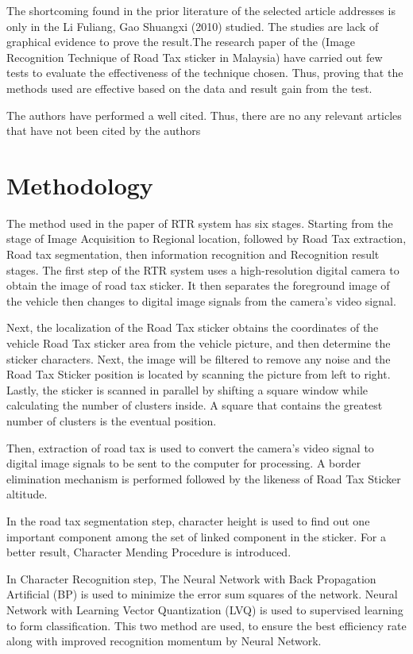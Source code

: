 \documentclass[12pt]{article}
\begin{document}
The shortcoming found in the prior literature of the selected article addresses is only in the Li Fuliang, Gao Shuangxi (2010) studied. The studies are lack of graphical evidence to prove the result.The research paper of the (Image Recognition Technique of Road Tax sticker in Malaysia) have carried out few tests to evaluate the effectiveness of the technique chosen. Thus, proving that the methods used are effective based on the data and result gain from the test.\cite{bpnn}

The authors have performed a well cited. Thus, there are no any relevant articles that have not been cited by the authors


\section{Methodology}
The method used in the paper of RTR system has six stages. Starting from the stage of Image Acquisition to Regional location, followed by Road Tax extraction, Road tax segmentation, then information recognition and Recognition result stages.
The first step of the RTR system uses a high-resolution digital camera to obtain the image of road tax sticker. It then separates the foreground image of the vehicle then changes to digital image signals from the camera's video signal. \cite{par}

Next, the localization of the Road Tax sticker obtains the coordinates of the vehicle Road Tax sticker area from the vehicle picture, and then determine the sticker characters. Next, the image will be filtered to remove any noise and the Road Tax Sticker position is located by scanning the picture from left to right. Lastly, the sticker is scanned in parallel by shifting a square window while calculating the number of clusters inside. A square that contains the greatest number of clusters is the eventual position.   

Then, extraction of road tax is used to convert the camera's video signal to digital image signals to be sent to the computer for processing. A border elimination mechanism is performed followed by the likeness of Road Tax Sticker altitude.  

In the road tax segmentation step, character height is used to find out one important component among the set of linked component in the sticker. For a better result, Character Mending Procedure is introduced.

In Character Recognition step, The Neural Network with Back Propagation Artificial (BP) is used to minimize the error sum squares of the network. Neural Network with Learning Vector Quantization (LVQ) is used to supervised learning to form classification. This two method are used, to ensure the best efficiency rate along with improved recognition momentum by Neural Network.\cite{location}\cite{bpnn}
\end{document}
